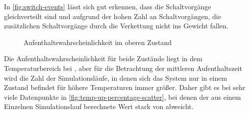 \documentclass[main.tex]{subfiles}
\begin{document}

In \cref{fig:switch-events} lässt sich gut erkennen, dass die Schaltvorgänge gleichverteilt sind und aufgrund der hohen Zahl an Schaltvorgängen, die zusätzlichen Schaltvorgänge durch die Verkettung nicht ins Gewicht fallen. 


\begin{figure}[H]
    \centering
    \caption{Aufenthaltswahrscheinlichkeit im oberen Zustand}\label{fig:temp-up-percentage}
\end{figure}

Die Aufenthaltswahrscheinlichkeit für beide Zustände liegt in dem Temperaturbereich bei , aber für die Betrachtung der mittleren Aufenthaltszeit wird die Zahl der Simulationsläufe, in denen sich das System nur in einem Zustand befindet für höhere Temperaturen immer größer. Daher gibt es bei  sehr viele Datenpunkte in \cref{fig:temp-up-percentage-scatter}, bei denen der aus einem Einzelnen Simulationslauf berechnete Wert stark von  abweicht.
\end{document}
